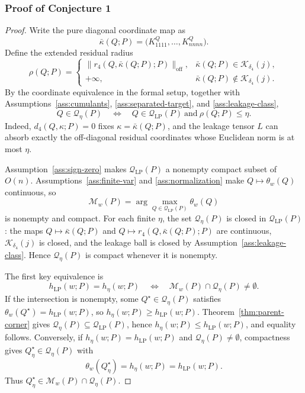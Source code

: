\documentclass[11pt]{article}
\theoremstyle{definition}
\theoremstyle{plain}
\theoremstyle{remark}
\begin{document}
\subsubsection*{Proof of Conjecture 1}
\begin{proof}
Write the pure diagonal coordinate map as
\[
\bar\kappa(Q;P)=\bigl(K^Q_{1111},\ldots,K^Q_{nnnn}\bigr).
\]
Define the extended residual radius
\[
\rho(Q;P)=
\begin{cases}
\|r_4(Q,\bar\kappa(Q;P);P)\|_{\mathrm{off}},
& \bar\kappa(Q;P)\in\mathcal K_{\delta_4}(j),\\
+\infty,
& \bar\kappa(Q;P)\notin\mathcal K_{\delta_4}(j).
\end{cases}
\]
By the coordinate equivalence in the formal setup, together with Assumptions~\ref{ass:cumulants}, \ref{ass:separated-target}, and \ref{ass:leakage-class},
\[
Q\in\mathcal Q_\eta(P)
\quad\Longleftrightarrow\quad
Q\in\mathcal Q_{\mathrm{LP}}(P)\ \text{and}\ \rho(Q;P)\le\eta .
\]
Indeed, \(d_4(Q,\kappa;P)=0\) fixes \(\kappa=\bar\kappa(Q;P)\), and the leakage tensor \(L\) can absorb exactly the off-diagonal residual coordinates whose Euclidean norm is at most \(\eta\).

Assumption~\ref{ass:sign-zero} makes \(\mathcal Q_{\mathrm{LP}}(P)\) a nonempty compact subset of \(O(n)\).  Assumptions~\ref{ass:finite-var} and \ref{ass:normalization} make \(Q\mapsto\theta_w(Q)\) continuous, so
\[
\mathcal M_w(P)=\arg\max_{Q\in\mathcal Q_{\mathrm{LP}}(P)}\theta_w(Q)
\]
is nonempty and compact.  For each finite \(\eta\), the set \(\mathcal Q_\eta(P)\) is closed in \(\mathcal Q_{\mathrm{LP}}(P)\): the maps \(Q\mapsto\bar\kappa(Q;P)\) and \(Q\mapsto r_4(Q,\bar\kappa(Q;P);P)\) are continuous, \(\mathcal K_{\delta_4}(j)\) is closed, and the leakage ball is closed by Assumption~\ref{ass:leakage-class}.  Hence \(\mathcal Q_\eta(P)\) is compact whenever it is nonempty.

The first key equivalence is
\[
h_{\mathrm{LP}}(w;P)=h_\eta(w;P)
\quad\Longleftrightarrow\quad
\mathcal M_w(P)\cap\mathcal Q_\eta(P)\ne\emptyset .
\]
If the intersection is nonempty, some \(Q^\star\in\mathcal Q_\eta(P)\) satisfies \(\theta_w(Q^\star)=h_{\mathrm{LP}}(w;P)\), so \(h_\eta(w;P)\ge h_{\mathrm{LP}}(w;P)\).  Theorem~\ref{thm:parent-corner} gives \(\mathcal Q_\eta(P)\subseteq\mathcal Q_{\mathrm{LP}}(P)\), hence \(h_\eta(w;P)\le h_{\mathrm{LP}}(w;P)\), and equality follows.  Conversely, if \(h_\eta(w;P)=h_{\mathrm{LP}}(w;P)\) and \(\mathcal Q_\eta(P)\ne\emptyset\), compactness gives \(Q_\eta^\star\in\mathcal Q_\eta(P)\) with
\[
\theta_w(Q_\eta^\star)=h_\eta(w;P)=h_{\mathrm{LP}}(w;P).
\]
Thus \(Q_\eta^\star\in\mathcal M_w(P)\cap\mathcal Q_\eta(P)\).


\end{proof}
\end{document}
